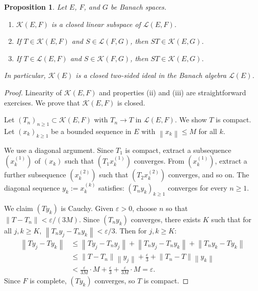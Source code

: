 \documentclass[a4paper,12pt]{book}
\newcommand{\norm}[1]{\left\| #1 \right\|}
\theoremstyle{definition}
\theoremstyle{plain}
\newtheorem{proposition}[definition]{Proposition}
\theoremstyle{remark}
\begin{document}

\begin{proposition}\label{prop:compact-ideal}
Let $E$, $F$, and $G$ be Banach spaces.
\begin{enumerate}[label=(\roman*)]
  \item $\mathcal{K}(E, F)$ is a closed linear subspace of $\mathcal{L}(E, F)$.
  \item If $T \in \mathcal{K}(E, F)$ and $S \in \mathcal{L}(F, G)$, then
        $ST \in \mathcal{K}(E, G)$.
  \item If $T \in \mathcal{L}(E, F)$ and $S \in \mathcal{K}(F, G)$, then
        $ST \in \mathcal{K}(E, G)$.
\end{enumerate}
In particular, $\mathcal{K}(E)$ is a closed two-sided ideal
in the Banach algebra $\mathcal{L}(E)$.
\end{proposition}

\begin{proof}
Linearity of $\mathcal{K}(E, F)$ and properties (ii) and (iii) are straightforward
exercises. We prove that $\mathcal{K}(E, F)$ is closed.

Let $(T_n)_{n \ge 1} \subset \mathcal{K}(E, F)$ with $T_n \to T$ in
$\mathcal{L}(E, F)$. We show $T$ is compact. Let $(x_k)_{k \ge 1}$
be a bounded sequence in $E$ with $\norm{x_k} \le M$ for all $k$.

We use a diagonal argument. Since $T_1$ is compact,
extract a subsequence $(x_k^{(1)})$ of $(x_k)$ such that $(T_1 x_k^{(1)})$
converges. From $(x_k^{(1)})$, extract a further subsequence $(x_k^{(2)})$ such
that $(T_2 x_k^{(2)})$ converges, and so on. The diagonal sequence
$y_k := x_k^{(k)}$ satisfies: $(T_n y_k)_{k \ge 1}$ converges for every
$n \ge 1$.

We claim $(Ty_k)$ is Cauchy. Given $\varepsilon > 0$, choose $n$ so that
$\norm{T - T_n} < \varepsilon / (3M)$. Since $(T_n y_k)$ converges, there
exists $K$ such that for all $j, k \ge K$,
$\norm{T_n y_j - T_n y_k} < \varepsilon / 3$. Then for $j, k \ge K$:
\begin{align*}
  \norm{Ty_j - Ty_k}
  &\le \norm{Ty_j - T_n y_j} + \norm{T_n y_j - T_n y_k} + \norm{T_n y_k - Ty_k} \\
  &\le \norm{T - T_n}\norm{y_j} + \frac{\varepsilon}{3} + \norm{T_n - T}\norm{y_k} \\
  &< \frac{\varepsilon}{3M} \cdot M + \frac{\varepsilon}{3} + \frac{\varepsilon}{3M} \cdot M
  = \varepsilon.
\end{align*}
Since $F$ is complete, $(Ty_k)$ converges, so $T$ is compact.
\end{proof}
\end{document}
